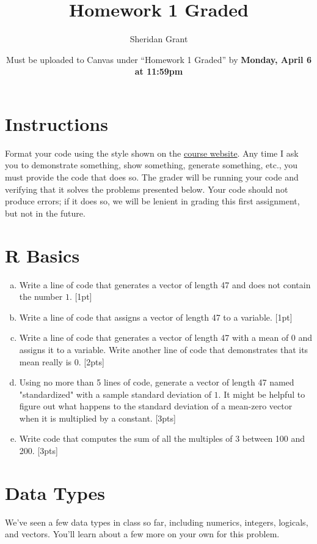 \documentclass[12pt]{article}
\title{Homework 1 Graded}
\author{Sheridan Grant}
\date{Must be uploaded to Canvas under ``Homework 1 Graded'' by \textbf{Monday, April 6 at 11:59pm}}
\begin{document}
\sloppy

\maketitle

\section*{Instructions}

Format your code using the style shown on the \href{https://sheridanlgrant.github.io/teaching/STAT302_SPR2020}{course website}. Any time I ask you to demonstrate something, show something, generate something, etc., you must provide the code that does so. The grader will be running your code and verifying that it solves the problems presented below. Your code should not produce errors; if it does so, we will be lenient in grading this first assignment, but not in the future.

\section{R Basics}

\begin{enumerate}[(a)]
	\item Write a line of code that generates a vector of length 47 and does not contain the number $1$. [1pt]
	\item Write a line of code that assigns a vector of length 47 to a variable. [1pt]
	\item Write a line of code that generates a vector of length 47 with a mean of $0$ and assigns it to a variable. Write another line of code that demonstrates that its mean really is $0$. [2pts]
	\item Using no more than 5 lines of code, generate a vector of length 47 named "standardized" with a sample standard deviation of $1$. It might be helpful to figure out what happens to the standard deviation of a mean-zero vector when it is multiplied by a constant. [3pts]
	\item Write code that computes the sum of all the multiples of $3$ between 100 and 200. [3pts]
\end{enumerate}

\section{Data Types}

We've seen a few data types in class so far, including numerics, integers, logicals, and vectors. You'll learn about a few more on your own for this problem.
\end{document}
